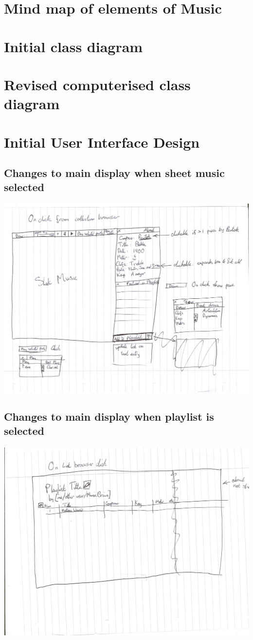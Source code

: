 \begin{appendices}
\section{Mind map of elements of Music}
\section{Initial class diagram}
\section{Revised computerised class diagram}
\section{Initial User Interface Design}
\subsection{Changes to main display when sheet music selected}
\includegraphics[width=400pt]{sheet_music_view.png}
\subsection{Changes to main display when playlist is selected}
\includegraphics[width=500pt]{playlist_view.png}

\end{appendices}
